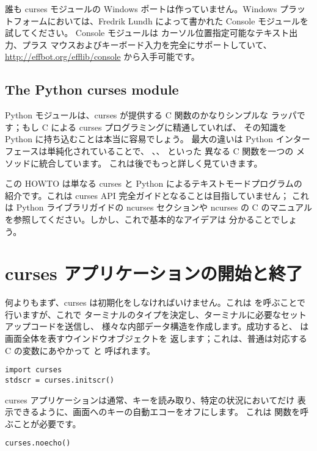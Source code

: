 \documentclass{howto}
\begin{document}
誰も curses モジュールの Windows ポートは作っていません。Windows 
プラットフォームにおいては、Fredrik Lundh によって書かれた Console モジュールを試してください。
Console モジュールは カーソル位置指定可能なテキスト出力、プラス
マウスおよびキーボード入力を完全にサポートしていて、
\url{http://effbot.org/efflib/console} から入手可能です。


\subsection{The Python curses module}

Python モジュールは、curses が提供する C 関数のかなりシンプルな
ラッパです；もし C による curses プログラミングに精通していれば、
その知識を Python に持ち込むことは本当に容易でしょう。
最大の違いは Python インターフェースは単純化されていることで、
、、 といった
異なる C 関数を一つの  メソッドに統合しています。
これは後でもっと詳しく見ていきます。

この HOWTO は単なる curses と Python によるテキストモードプログラムの
紹介です。これは curses API 完全ガイドとなることは目指していません；
これは Python ライブラリガイドの ncurses セクションや ncurses の
C のマニュアルを参照してください。しかし、これで基本的なアイデアは
分かることでしょう。

\section{curses アプリケーションの開始と終了}

何よりもまず、curses は初期化をしなければいけません。これは
 を呼ぶことで行いますが、これで
ターミナルのタイプを決定し、ターミナルに必要なセットアップコードを送信し、
様々な内部データ構造を作成します。成功すると、
 は画面全体を表すウインドウオブジェクトを
返します；これは、普通は対応する C の変数にあやかって  と
呼ばれます。

\begin{verbatim}
import curses
stdscr = curses.initscr()
\end{verbatim}

curses アプリケーションは通常、キーを読み取り、特定の状況においてだけ
表示できるように、画面へのキーの自動エコーをオフにします。
これは  関数を呼ぶことが必要です。

\begin{verbatim}
curses.noecho()
\end{verbatim}
\end{document}
